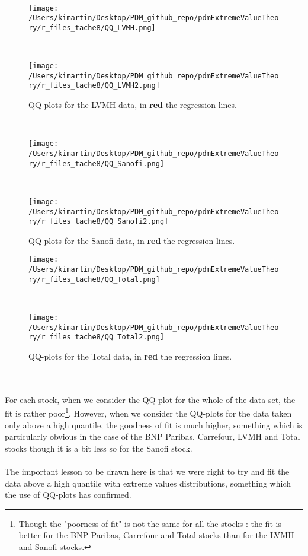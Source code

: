\\
\begin{figure}[h!]
	\centering
	\begin{minipage}[b]{0.4\textwidth}
		\centering
		\texttt{[image: /Users/kimartin/Desktop/PDM\_github\_repo/pdmExtremeValueTheory/r\_files\_tache8/QQ\_LVMH.png]}
		\label{fig:QQLVMH1}
	\end{minipage}
	~
	\begin{minipage}[b]{0.4\textwidth}
		\centering
		\texttt{[image: /Users/kimartin/Desktop/PDM\_github\_repo/pdmExtremeValueTheory/r\_files\_tache8/QQ\_LVMH2.png]}
		\label{fig:QQLVMH2}
	\end{minipage}
	\caption{QQ-plots for the LVMH data, in \textbf{red} the regression lines.}
\end{figure}
\\
\begin{figure}[h!]
	\centering
	\begin{minipage}[b]{0.4\textwidth}
		\centering
		\texttt{[image: /Users/kimartin/Desktop/PDM\_github\_repo/pdmExtremeValueTheory/r\_files\_tache8/QQ\_Sanofi.png]}
		\label{fig:QQSanofi1}
	\end{minipage}
	~
	\begin{minipage}[b]{0.4\textwidth}
		\centering
		\texttt{[image: /Users/kimartin/Desktop/PDM\_github\_repo/pdmExtremeValueTheory/r\_files\_tache8/QQ\_Sanofi2.png]}
		\label{fig:QQSanofi2}
	\end{minipage}
	\caption{QQ-plots for the Sanofi data, in \textbf{red} the regression lines.}
\end{figure}
\clearpage
\begin{figure}[h!]
	\centering
	\begin{minipage}[b]{0.4\textwidth}
		\centering
		\texttt{[image: /Users/kimartin/Desktop/PDM\_github\_repo/pdmExtremeValueTheory/r\_files\_tache8/QQ\_Total.png]}
		\label{fig:QQTotal1}
	\end{minipage}
	~
	\begin{minipage}[b]{0.4\textwidth}
		\centering
		\texttt{[image: /Users/kimartin/Desktop/PDM\_github\_repo/pdmExtremeValueTheory/r\_files\_tache8/QQ\_Total2.png]}
		\label{fig:QQTotal2}
	\end{minipage}
	\caption{QQ-plots for the Total data, in \textbf{red} the regression lines.}
\end{figure}
\\
\paragraph{}
For each stock, when we consider the QQ-plot for the whole of the data set, the fit is rather poor\footnote{Though the "poorness of fit" is not the same for all the stocks : the fit is better for the BNP Paribas, Carrefour and Total stocks than for the LVMH and Sanofi stocks.}. However, when we consider the QQ-plots for the data taken only above a high quantile, the goodness of fit is much higher, something which is particularly obvious in the case of the BNP Paribas, Carrefour, LVMH and Total stocks though it is a bit less so for the Sanofi stock.
\paragraph{}
The important lesson to be drawn here is that we were right to try and fit the data above a high quantile with extreme values distributions, something which the use of QQ-plots has confirmed.